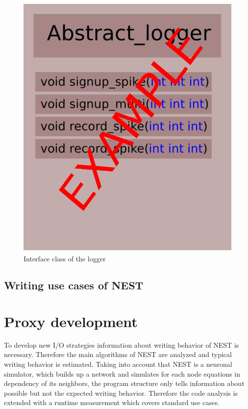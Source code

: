 \documentclass[]{YIC2015}
\begin{document}
\begin{figure}[htbp]
\centering %
\includegraphics[scale=0.5]{loggerinterface.eps}
\caption{Interface class of the logger}
\label{fig:loggerinterface}
\end{figure}


\subsection{Writing use cases of NEST}

\section{Proxy development}
To develop new I/O strategies information about writing behavior of NEST is necessary.
Therefore the main algorithms of NEST are analyzed and typical writing behavior is estimated.
Taking into account that NEST is a neuronal simulator,
which builds up a network and simulates for each  node equations in dependency of its neighbors,
the program structure only tells information about possible but not the expected writing behavior.
Therefore the code analysis is extended with a runtime measurement which covers standard use cases.
\end{document}
